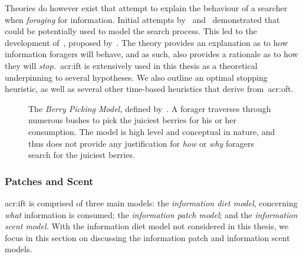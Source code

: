 Theories do however exist that attempt to explain the behaviour of a searcher when \emph{foraging} for information. Initial attempts by~\cite{russell1993sense_making} and~\cite{sandstrom1994optimal_foraging} demonstrated that~~\citep{stephens1986foraging_theory} could be potentially used to model the search process. This led to the development of~, proposed by~\cite{pirolli1999ift}. The theory provides an explanation as to how information foragers will behave, and as such, also provides a rationale as to how they will \emph{stop.}~\gls{acr:ift} is extensively used in this thesis as a theoretical underpinning to several hypotheses. We also outline an optimal stopping heuristic, as well as several other time-based heuristics that derive from~\gls{acr:oft}.

\begin{figure}[t!]
    \centering
    \caption[The Berry Picking Model~\cite{bates1989berry_picking}]{The \emph{Berry Picking Model,} defined by~\cite{bates1989berry_picking}. A forager traverses through numerous bushes to pick the juiciest berries for his or her consumption. The model is high level and conceptual in nature, and thus does not provide any justification for \emph{how} or \emph{why} foragers search for the juiciest berries.}
    \label{fig:berry_picking}
\end{figure}

\subsubsection{Patches and Scent}\label{sec:stopping_background:theoretical:ift:patch}
\gls{acr:ift} is comprised of three main models: the \emph{information diet model}, concerning \emph{what} information is consumed; the \emph{information patch model}; and the \emph{information scent model.} With the information diet model not considered in this thesis, we focus in this section on discussing the information patch and information scent models.

